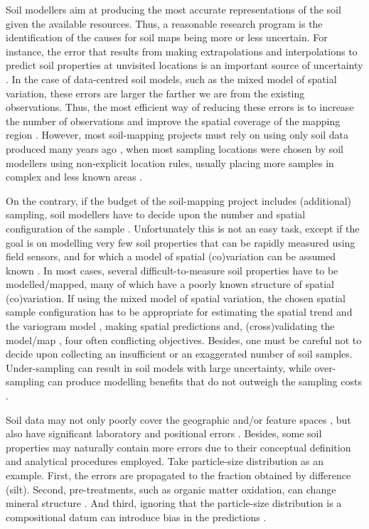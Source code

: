 Soil modellers aim at producing the most accurate representations of the soil given the
available resources. Thus, a reasonable research program is the identification of the causes for
soil maps being more or less uncertain. For instance, the error that results from making
extrapolations and interpolations to predict soil properties at unvisited locations is an
important source of uncertainty \cite{HeuvelinkEtAl1999, RefsgaardEtAl2006}. In the case of
data-centred soil models, such as the mixed model of spatial variation, these errors are
larger the farther we are from the existing observations. Thus, the most efficient way of reducing
these errors is to increase the number of observations and improve the spatial coverage of the mapping
region \cite{BrusEtAl2007a}. However, most soil-mapping projects must rely on using only soil
data produced many years ago \cite{KempenEtAl2009, HenglEtAl2014, PoggioEtAl2014, 
NussbaumEtAl2014, MulderEtAl2016}, when most sampling locations were chosen by soil 
modellers using non-explicit location rules, usually placing more samples in complex and
less known areas \cite{Rossiter2000}.

On the contrary, if the budget of the soil-mapping project includes (additional) sampling, soil
modellers have to decide upon the number and spatial configuration of the sample
\cite{deGruijterEtAl2006, WebsterEtAl2013}. Unfortunately this is not an easy task, except if the
goal is on modelling very few soil properties that can be rapidly measured using field
sensors, and for which a model of spatial (co)variation can be assumed known \cite{MarchantEtAl2006}.
In most cases, several difficult-to-measure soil properties have to be modelled/mapped, many of
which have a poorly known structure of spatial (co)variation. If using the mixed model of spatial
variation, the chosen spatial sample configuration has to be appropriate for estimating the spatial
trend \cite{HenglEtAl2003a, MinasnyEtAl2006b} and the variogram model
\cite{WarrickEtAl1987, WebsterEtAl1992, Lark2002}, making spatial predictions
\cite{YfantisEtAl1987, WalvoortEtAl2010} and, (cross)validating the model/map \cite{BrusEtAl2011}, four
often conflicting objectives. Besides, one must be careful not to decide upon collecting an insufficient
 or an exaggerated number of soil samples. Under-sampling can result in soil models with large 
uncertainty, while over-sampling can produce modelling benefits that do not outweigh the sampling costs 
\cite{vanGroenigenEtAl1999}.

Soil data may not only poorly cover the geographic and/or feature spaces \cite{HenglEtAl2003a}, but
also have significant laboratory and positional errors \cite{NelsonEtAl2011}. Besides, some soil
properties may naturally contain more errors due to their conceptual definition and analytical
procedures employed. Take particle-size distribution as an example. First, the errors are propagated
to the fraction obtained by difference (silt). Second, pre-treatments, such as organic matter
oxidation, can change mineral structure \cite{MikuttaEtAl2005a}. And third, ignoring that the
particle-size distribution is a compositional datum can introduce bias in the predictions
\cite{LarkEtAl2007}.

